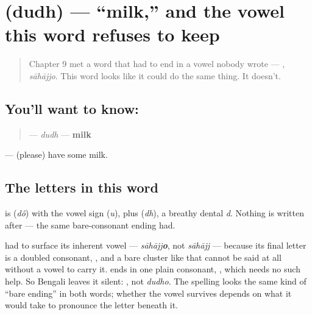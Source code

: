 \section[dudh]{ (dudh) — \textquotedblleft{}milk,\textquotedblright{} and the vowel this word refuses to keep}

\label{lesson:BN-C10-dudh}



\begin{quote}
Chapter 9 met a word that had to end in a vowel nobody wrote — , \emph{sāhājjo}. This word looks like it could do the same thing. It doesn't.
\end{quote}

\subsection*{You'll want to know: }
\begin{quote}
\textbf{} — \emph{dudh} — \textbf{milk}
\end{quote}

\textbf{ } — (please) have some milk.

\subsection*{The letters in this word}
\textbf{} is \textbf{} (\emph{dô}) with the vowel sign \textbf{} (\emph{u}), plus \textbf{} (\emph{dh}), a breathy dental \emph{d}. Nothing is written after  — the same bare-consonant ending  had.

\begin{sounds}
 had to surface its inherent vowel — \emph{sāhājj\textbf{o}}, not \emph{sāhājj} — because its final letter is a doubled consonant, \textbf{}, and a bare cluster like that cannot be said at all without a vowel to carry it.  ends in one plain consonant, , which needs no such help. So Bengali leaves it silent: \textbf{}, not \emph{dudho}. The spelling looks the same kind of \textquotedblleft{}bare ending\textquotedblright{} in both words; whether the vowel survives depends on what it would take to pronounce the letter beneath it.
\end{sounds}

